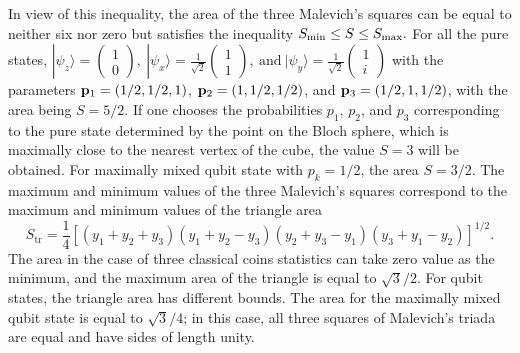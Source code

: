 \documentclass[12pt]{article}
\begin{document}
In view of this inequality, the area of the three Malevich's squares
can be equal to neither six nor zero but satisfies the inequality
$S_{\rm min}\leq S\leq S_{\rm max}.$
For all the pure states, $|\psi_z\rangle=\left(\begin{array}{cc}
1\\
0
\end{array}\right),~|\psi_x\rangle=%
\frac{1}{\sqrt2}\left(\begin{array}{cc}
1\\
1
\end{array}\right),~\mbox{and}~|\psi_y\rangle=%
\frac{1}{\sqrt2}\left(\begin{array}{cc}
1\\
i
\end{array}\right)$
with the parameters ${\bf p}_1=(1/2,1/2,1)$, ${\bf
p}_2=(1,1/2,1/2)$, and ${\bf p}_3=(1/2,1,1/2)$, with the area being
$S=5/2$. If one chooses the probabilities $p_1$, $p_2$, and $p_3$
corresponding to the pure state determined by the point on the Bloch
sphere, which is maximally close to the nearest vertex of the cube,
the value $S=3$ will be obtained. For maximally mixed qubit state
with $p_k=1/2$, the area $S=3/2$. The maximum and minimum values of
the three Malevich's squares correspond to the maximum and minimum
values of the triangle area
\begin{equation}\label{eq.M7}
S_{\mbox{tr}}=\frac{1}{4}\left[\left(y_1+y_2+y_3\right)\left(y_1+y_2-y_3\right)
\left(y_2+y_3-y_1\right)\left(y_3+y_1-y_2\right)\right]^{1/2}.
\end{equation}
The area in the case of three classical coins statistics can take
zero value as the minimum, and the maximum area of the triangle is
equal to ${\sqrt3}/{2}$. For qubit states, the triangle area has
different bounds. The area for the maximally mixed qubit state is
equal to $\sqrt 3/4$; in this case, all three squares of Malevich's
triada are equal and have sides of length unity.
\end{document}
